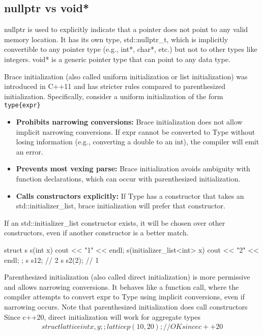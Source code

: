 \documentclass{report}
\begin{document}
    \bigbreak \noindent 
    \subsection{nullptr vs void*}
    \bigbreak \noindent 
    nullptr is used to explicitly indicate that a pointer does not point to any valid memory location.
    \bigbreak \noindent 
    It has its own type, std::nullptr\_t, which is implicitly convertible to any pointer type (e.g., int*, char*, etc.) but not to other types like integers.
    \bigbreak \noindent 
    void* is a generic pointer type that can point to any data type.


    \pagebreak 
    \bigbreak \noindent 
    Brace initialization (also called uniform initialization or list initialization) was introduced in C++11 and has stricter rules compared to parenthesized initialization. Specifically, consider a uniform initialization of the form \texttt{type\{expr\}}
    \begin{itemize}
        \item \textbf{Prohibits narrowing conversions:} Brace initialization does not allow implicit narrowing conversions. If expr cannot be converted to Type without losing information (e.g., converting a double to an int), the compiler will emit an error.
        \item \textbf{Prevents most vexing parse:} Brace initialization avoids ambiguity with function declarations, which can occur with parenthesized initialization.
        \item \textbf{Calls constructors explicitly:} If Type has a constructor that takes an std::initializer\_list, brace initialization will prefer that constructor.
    \end{itemize}
    \bigbreak \noindent 
    If an std::initializer\_list constructor exists, it will be chosen over other constructors, even if another constructor is a better match.
    \bigbreak \noindent 
    \begin{cppcode}
        struct s {
            s(int x) {cout << "1" << endl;}
            s(initializer_list<int> x) {cout << "2" << endl;}
        };
        s s1{2}; // 2
        s s2(2); // 1
    \end{cppcode}




    \bigbreak \noindent 
    Parenthesized initialization (also called direct initialization) is more permissive and allows narrowing conversions. It behaves like a function call, where the compiler attempts to convert expr to Type using implicit conversions, even if narrowing occurs.
    \bigbreak \noindent 
    Note that parenthesized initialization does call constructors
    \bigbreak \noindent 
    Since c++20, direct initialization will work for aggregate types
    \begin{align*}
        struct lattice {
            int x,y;
        };
        lattice p(10,20); // OK since c++20
    \end{align*}
\end{document}
